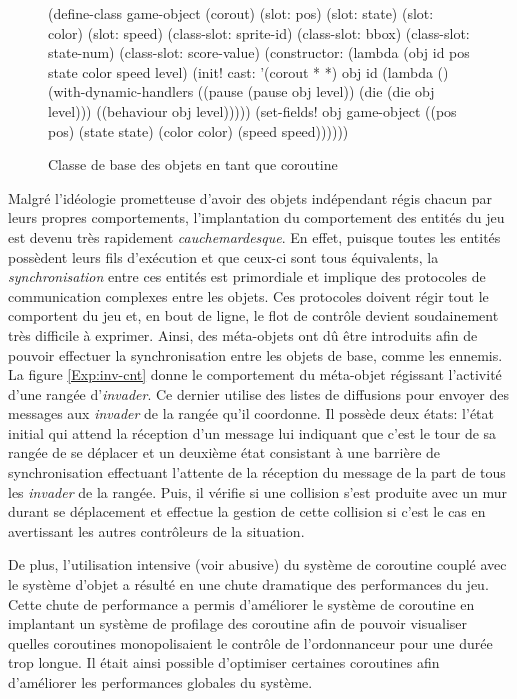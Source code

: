 \documentclass[12pt,oneside,letterpaper,francais]{book}
\newcommand{\scheme}[1]{\selectlanguage{english}{\tt #1}\selectlanguage{french}}
\begin{document}
\begin{figure}[htb!]
  \begin{schemecode}
(define-class game-object (corout)
  (slot: pos)
  (slot: state)
  (slot: color)
  (slot: speed)
  (class-slot: sprite-id)
  (class-slot: bbox)
  (class-slot: state-num)
  (class-slot: score-value)
  (constructor: (lambda (obj id pos state color speed level)
                  (init! cast: '(corout * *) obj id
                         (lambda ()(with-dynamic-handlers
                                    ((pause (pause obj level))
                                     (die   (die   obj level)))
                                    ((behaviour obj level)))))
                  (set-fields! obj game-object
                    ((pos pos)     (state state)
                     (color color) (speed speed))))))
  \end{schemecode}
  \caption{Classe de base des objets en tant que coroutine}
  \label{Exp:si3-class}
\end{figure}

Malgré l'idéologie prometteuse d'avoir des objets indépendant régis
chacun par leurs propres comportements, l'implantation du comportement
des entités du jeu est devenu très rapidement
\emph{cauchemardesque}. En effet, puisque toutes les entités possèdent
leurs fils d'exécution et que ceux-ci sont tous équivalents, la
\emph{synchronisation} entre ces entités est primordiale et implique
des protocoles de communication complexes entre les objets. Ces
protocoles doivent régir tout le comportent du jeu et, en bout de
ligne, le flot de contrôle devient soudainement très difficile à
exprimer. Ainsi, des méta-objets ont dû être introduits afin de
pouvoir effectuer la synchronisation entre les objets de base, comme
les ennemis. La figure \ref{Exp:inv-cnt} donne le comportement du
méta-objet régissant l'activité d'une rangée d'\textit{invader}. Ce
dernier utilise des listes de diffusions pour envoyer des messages aux
\textit{invader} de la rangée qu'il coordonne. Il possède deux états:
l'état initial qui attend la réception d'un message lui indiquant que
c'est le tour de sa rangée de se déplacer et un deuxième état
consistant à une barrière de synchronisation effectuant l'attente de
la réception du message \scheme{moved} de la part de tous les
\textit{invader} de la rangée. Puis, il vérifie si une collision s'est
produite avec un mur durant se déplacement et effectue la gestion de
cette collision si c'est le cas en avertissant les autres contrôleurs
de la situation.

De plus, l'utilisation intensive (voir abusive) du système de
coroutine couplé avec le système d'objet a résulté en une chute
dramatique des performances du jeu. Cette chute de performance a
permis d'améliorer le système de coroutine en implantant un système de
profilage des coroutine afin de pouvoir visualiser quelles coroutines
monopolisaient le contrôle de l'ordonnanceur pour une durée trop
longue. Il était ainsi possible d'optimiser certaines coroutines afin
d'améliorer les performances globales du système.
\end{document}

